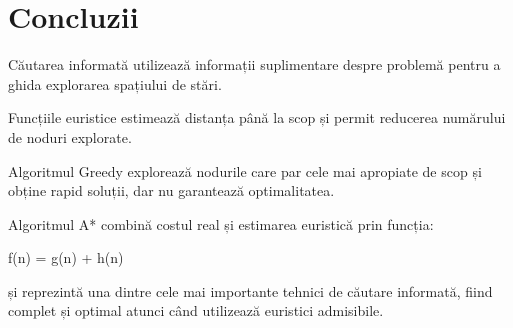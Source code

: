 \documentclass[12pt,a4paper]{article}
\begin{document}
\section{Concluzii}

Căutarea informată utilizează informații suplimentare despre problemă pentru a ghida explorarea spațiului de stări.

Funcțiile euristice estimează distanța până la scop și permit reducerea numărului de noduri explorate.

Algoritmul Greedy explorează nodurile care par cele mai apropiate de scop și obține rapid soluții, dar nu garantează optimalitatea.

Algoritmul A* combină costul real și estimarea euristică prin funcția:

f(n) = g(n) + h(n)

și reprezintă una dintre cele mai importante tehnici de căutare informată, fiind complet și optimal atunci când utilizează euristici admisibile.
\end{document}
